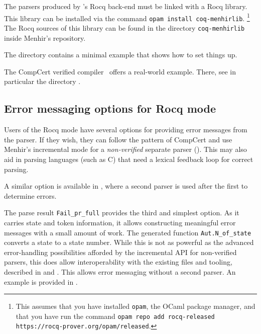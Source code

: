 \documentclass[onecolumn,11pt,nocopyrightspace,preprint]{sigplanconf}
\begin{document}



The parsers produced by \menhir's Rocq back-end must be linked with a Rocq
library. This library can be installed via the command
\verb+opam install coq-menhirlib+.%
%
\footnote{This assumes that you have installed \texttt{opam}, the OCaml package manager,
and that you have run the command
\texttt{opam repo add rocq-released https://rocq-prover.org/opam/released}.}
%
The Rocq sources of this library can be found in
the directory \texttt{coq-menhirlib}
inside Menhir's repository.

The directory  contains a minimal example that
shows how to set things up.

The CompCert verified compiler~\cite{compcert,compcert-github} offers a
real-world example. There, see in particular the directory
.

\subsection{Error messaging options for Rocq mode}
\label{sec:rocq:errmsg}
Users of the Rocq mode have several options for providing error messages from the parser.
If they wish, they can follow the pattern of CompCert and use Menhir's incremental mode for
a \textit{non-verified} separate parser (). This may also aid in parsing
languages (such as C) that need a lexical feedback loop for correct parsing.

A similar option is available in , where a second parser is used after the
first to determine errors.

The parse result \verb+Fail_pr_full+ provides the third and simplest option.
As it carries state and token information, it allows constructing meaningful
error messages with a small amount of work. The generated function
\verb+Aut.N_of_state+ converts a state to a state number. While this is not as
powerful as the advanced error-handling possibilities afforded by the incremental API for
non-verified parsers, this does allow interoperability with the existing
\messages files and tooling, described in  and
. This allows error messaging without a second
parser. An example is provided in .
\end{document}
